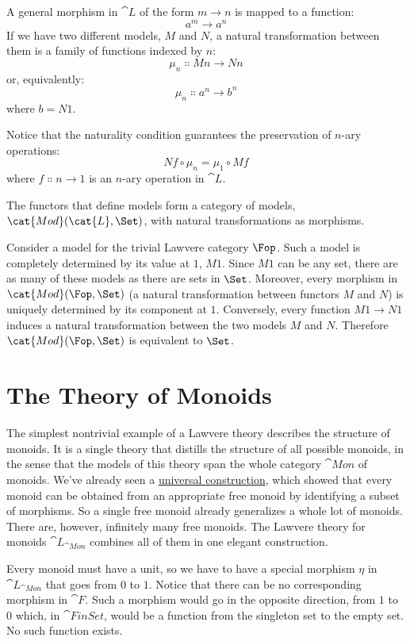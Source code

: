 A general morphism in $\cat{L}$ of the form
$m \to n$ is mapped to a function:
\[a^m \to a^n\]
If we have two different models, $M$ and $N$, a natural
transformation between them is a family of functions indexed by
$n$:
\[\mu_n \Colon M n \to N n\]
or, equivalently:
\[\mu_n \Colon a^n \to b^n\]
where $b = N 1$.

Notice that the naturality condition guarantees the preservation of
$n$-ary operations:
\[N f \circ \mu_n = \mu_1 \circ M f\]
where $f \Colon n \to 1$ is an $n$-ary operation in
$\cat{L}$.

The functors that define models form a category of models,
$\cat{Mod}(\cat{L}, \Set)$, with natural transformations as morphisms.

Consider a model for the trivial Lawvere category
$\Fop$. Such a model is completely determined by
its value at $1$, $M 1$. Since $M 1$ can be any
set, there are as many of these models as there are sets in
$\Set$. Moreover, every morphism in $\cat{Mod}(\Fop, \Set)$ (a
natural transformation between functors $M$ and $N$) is
uniquely determined by its component at $1$. Conversely, every
function $M 1 \to N 1$ induces a natural
transformation between the two models $M$ and $N$.
Therefore $\cat{Mod}(\Fop, \Set)$ is equivalent to $\Set$.

\section{The Theory of Monoids}

The simplest nontrivial example of a Lawvere theory describes the
structure of monoids. It is a single theory that distills the structure
of all possible monoids, in the sense that the models of this theory
span the whole category $\cat{Mon}$ of monoids. We've already seen a
\hyperref[free-monoids]{universal
  construction}, which showed that every monoid can be obtained from an
appropriate free monoid by identifying a subset of morphisms. So a
single free monoid already generalizes a whole lot of monoids. There
are, however, infinitely many free monoids. The Lawvere theory for
monoids $\cat{L}_{\cat{Mon}}$ combines all of them in one
elegant construction.

Every monoid must have a unit, so we have to have a special morphism
$\eta$ in $\cat{L}_{\cat{Mon}}$ that goes from $0$ to
$1$. Notice that there can be no corresponding morphism in
$\cat{F}$. Such a morphism would go in the opposite direction, from
$1$ to $0$ which, in $\cat{FinSet}$, would be a function
from the singleton set to the empty set. No such function exists.

